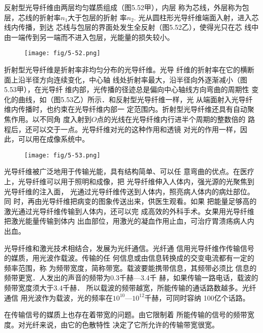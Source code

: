 反射型光导纤维由两层均匀媒质组成（图5.52甲），内层
称为芯线，外层称为包层，芯线的折射率$n_1$大于包层的折射
率$n_2$. 光从圆柱形光导纤维端面入射，进入芯线内传播，到达
芯线与包层的界面处发生全反射（图5.52乙），使得光只在芯
线中由一端传到另一端而不进入包层，光能量的损失较小。
\begin{figure}[htp]\centering
\texttt{[image: fig/5-52.png]}
    \caption{}
    \end{figure}

折射型光导纤维是折射率非均匀分布的光导纤维。光导
纤维的折射率在它的横断面上沿半径方向连续变化，中心轴
线处折射率最大，沿半径向外逐渐减小（图5.53甲），在光导纤
维内部，光传播的径迹总是偏向中心轴线方向弯曲的周期性
变化的曲线，如（图5.53乙）所示．和反射型光导纤维一样，光
从端面射入光导纤维内传播时，也约束在光导纤维内部一
定范围内。折射型光导纤维还具有自动聚焦作用。以不同角
度入射到$O$点的光线在光导纤维内行进半个周期的整数倍的
路程后，还可以交于一点。光导纤维对光的这种作用和透镜
对光的作用一样，因此，可以用在成像系统中。
\begin{figure}[htp]\centering
    \texttt{[image: fig/5-53.png]}
        \caption{}
        \end{figure}

光导纤维被广泛地用于传输光能，具有结构简单、可以任
意弯曲的优点。在医疗上，光导纤维可以用于照明和成像，把
光导纤维伸入人体内，强光源的光聚焦到光导纤维的注入面，
光通过光导纤维传送到人体内，照亮病人体内的病灶部位。同
时，再由光导纤维把病变的图象传送出来，供医生观看。如果
把能量足够高的激光通过光导纤维传输到人体内，还可以完
成高效的外科手术。女果用光导纤维把激光能量传输到体内
出血部位，用激光的凝血作用止血，可治疗胃溃疡病人内
出血。

光导纤维和激光技术相结合，发展为光纤通信。光纤通
信用光导纤维作传输信号的媒质，用光波作载波。传输的任
何信息或由信息转换成的交变电流都有一定的频率范围，称
为频带宽度，简称带宽。载波要能携带信息，其频带必须比
信息的频带更宽．人发出的声音的频带为0.3千赫—3.4千
赫，如果传输一路电话，载波的频带宽度须大于3.4千赫．
所以载波的频带越宽，所能传输的通话路数越多。光纤通信
用光波作为载波，光的频率在$10^{10}$—$10^{12}$千赫，可同时容纳
100亿个话路。

在传输信号的媒质上也存在着带宽的问题。由它限制着
所能传输的信号的频带宽度。对光纤来说，由它的色散特性
决定了它所允许的传输带宽很宽。


